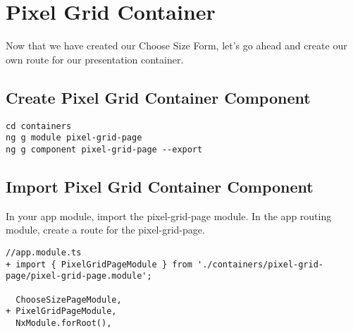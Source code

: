 \maketitle{}
\section{ Pixel Grid Container }

Now that we have created our Choose Size Form, let's go ahead and create our own
route for our presentation container.

\subsection{ Create Pixel Grid Container Component }
\begin{lstlisting}
cd containers
ng g module pixel-grid-page
ng g component pixel-grid-page --export
\end{lstlisting}

\subsection{ Import Pixel Grid Container Component }
In your app module, import the pixel-grid-page module. In the app routing
module, create a route for the pixel-grid-page.

\begin{lstlisting}
//app.module.ts
+ import { PixelGridPageModule } from './containers/pixel-grid-page/pixel-grid-page.module';

  ChooseSizePageModule,
+ PixelGridPageModule,
  NxModule.forRoot(),
\end{lstlisting}
